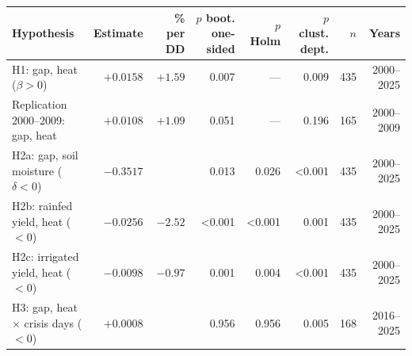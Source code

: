\begin{tabular}{>{\raggedright}p{4.6cm}rrrrrrr}
\toprule
Hypothesis & Estimate & \% per DD & \shortstack{$p$ boot.\\one-sided} & \shortstack{$p$\\Holm} & \shortstack{$p$ clust.\\dept.} & $n$ & Years \\
\midrule
H1: gap, heat ($\beta > 0$) & $+0.0158$ & $+1.59$ & 0.007 & --- & 0.009 & 435 & 2000--2025 \\
Replication 2000--2009: gap, heat & $+0.0108$ & $+1.09$ & 0.051 & --- & 0.196 & 165 & 2000--2009 \\
H2a: gap, soil moisture ($\delta < 0$) & $-0.3517$ &  & 0.013 & 0.026 & <0.001 & 435 & 2000--2025 \\
H2b: rainfed yield, heat ($< 0$) & $-0.0256$ & $-2.52$ & <0.001 & <0.001 & 0.001 & 435 & 2000--2025 \\
H2c: irrigated yield, heat ($< 0$) & $-0.0098$ & $-0.97$ & 0.001 & 0.004 & <0.001 & 435 & 2000--2025 \\
H3: gap, heat $\times$ crisis days ($< 0$) & $+0.0008$ &  & 0.956 & 0.956 & 0.005 & 168 & 2016--2025 \\
\bottomrule
\end{tabular}
